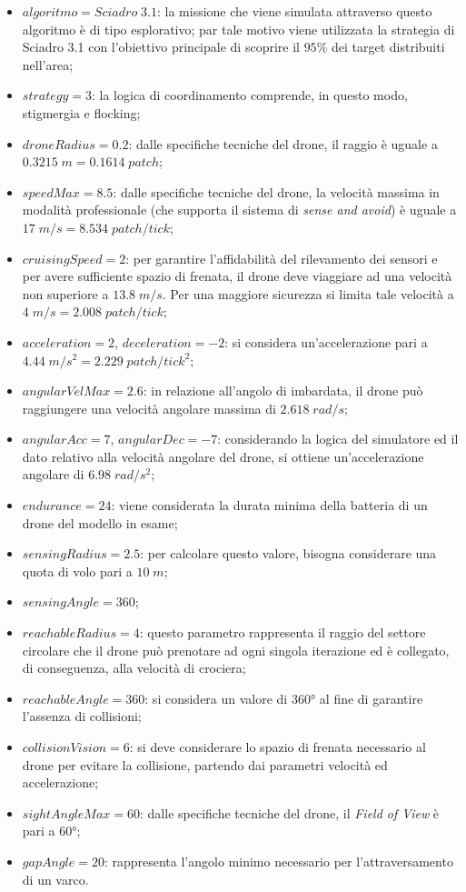 \begin{itemize}
    \item $algoritmo = Sciadro \; 3.1$: la missione che viene simulata attraverso questo algoritmo è di tipo esplorativo; par tale motivo viene utilizzata la strategia di Sciadro 3.1 con l'obiettivo principale di scoprire il $95 \%$ dei target distribuiti nell'area;
    \item $strategy = 3$: la logica di coordinamento comprende, in questo modo, stigmergia e flocking;
    \item $droneRadius = 0.2$: dalle specifiche tecniche del drone, il raggio è uguale a $0.3215 \; m = 0.1614 \; patch$;
    \item $speedMax = 8.5$: dalle specifiche tecniche del drone, la velocità massima in modalità professionale (che supporta il sistema di \textit{sense and avoid}) è uguale a $17 \; m/s = 8.534 \; patch/tick$;
    \item $cruisingSpeed = 2$: per garantire l'affidabilità del rilevamento dei sensori e per avere sufficiente spazio di frenata, il drone deve viaggiare ad una velocità non superiore a $13.8 \; m/s$. Per una maggiore sicurezza si limita tale velocità a $4 \; m/s = 2.008 \; patch/tick$;
    \item $acceleration = 2$, $deceleration = -2$: si considera un'accelerazione pari a $4.44 \; m/s^{2} = 2.229 \; patch/tick^{2}$;
    \item $angularVelMax = 2.6$: in relazione all'angolo di imbardata, il drone può raggiungere una velocità angolare massima di $2.618 \; rad/s$;
    \item $angularAcc = 7$, $angularDec = -7$: considerando la logica del simulatore ed il dato relativo alla velocità angolare del drone, si ottiene un'accelerazione angolare di $6.98 \; rad/s^{2}$;
    \item $endurance = 24$: viene considerata la durata minima della batteria di un drone del modello in esame;
    \item $sensingRadius = 2.5$: per calcolare questo valore, bisogna considerare una quota di volo pari a $10 \; m$;
    \item $sensingAngle = 360$;
    \item $reachableRadius = 4$: questo parametro rappresenta il raggio del settore circolare che il drone può prenotare ad ogni singola iterazione ed è collegato, di conseguenza, alla velocità di crociera;
    \item $reachableAngle = 360$: si considera un valore di \ang{360} al fine di garantire l'assenza di collisioni;
    \item $collisionVision = 6$: si deve considerare lo spazio di frenata necessario al drone per evitare la collisione, partendo dai parametri velocità ed accelerazione;
    \item $sightAngleMax = 60$: dalle specifiche tecniche del drone, il \textit{Field of View} è pari a \ang{60};
    \item $gapAngle = 20$: rappresenta l'angolo minimo necessario per l'attraversamento di un varco. 
\end{itemize}

